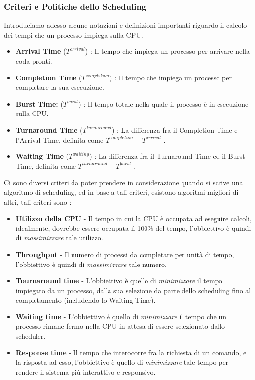 \documentclass[12pt, letterpaper]{article}
\begin{document}
\subsubsection{Criteri e Politiche dello Scheduling}
Introduciamo adesso alcune notazioni e definizioni importanti riguardo il calcolo dei tempi che un processo 
impiega sulla CPU.\begin{itemize}
    \item \textbf{Arrival Time} (\(T^{arrival}\)) : Il tempo che impiega un processo per arrivare nella coda pronti.
    \item \textbf{Completion Time}  (\(T^{completion}\)) : Il tempo che impiega un processo per completare la sua esecuzione.
    \item \textbf{Burst Time:}  (\(T^{burst}\)) : Il tempo totale nella quale il processo è in esecuzione sulla CPU.
    \item \textbf{ Turnaround Time} (\(T^{turnaround}\))  : La differenza fra il Completion Time e l'Arrival Time, definita 
    come \(T^{completion}-T^{arrival}\) .
    \item \textbf{ Waiting Time} (\(T^{waiting}\)) : La differenza fra il Turnaround Time ed il Burst Time, definita 
    come \(T^{turnaround}-T^{burst}\) .
\end{itemize}
Ci sono diversi criteri da poter prendere in considerazione quando si scrive una algoritmo di scheduling, ed in 
base a tali criteri, esistono algoritmi migliori di altri, tali criteri sono :\begin{itemize}
    \item \textbf{Utilizzo della CPU} - Il tempo in cui la CPU è occupata ad eseguire calcoli, idealmente, dovrebbe 
    essere occupata il 100\(\%\) del tempo, l'obbiettivo è quindi di \textit{massimizzare} tale utilizzo.
    \item \textbf{Throughput} - Il numero di processi da completare per unità di tempo, l'obbiettivo è quindi di \textit{massimizzare} tale numero.
    \item \textbf{Tournaround time} - L'obbiettivo è quello di \textit{minimizzare} il tempo impiegato da un processo, 
    dalla sua selezione da parte dello scheduling fino al completamento (includendo lo Waiting Time).
    \item \textbf{Waiting time} - L'obbiettivo è quello di \textit{minimizzare} il tempo che un processo 
    rimane fermo nella CPU in attesa di essere selezionato dallo scheduler.
    \item \textbf{Response time} - Il tempo che interocorre fra la richiesta di un comando, e la risposta ad esso, l'obbiettivo 
    è quello di \textit{minimizzare} tale tempo per rendere il sistema più interattivo e responsivo.
\end{itemize}
\end{document}

